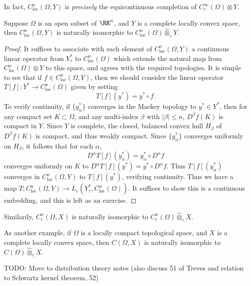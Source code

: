In fact, $C^n_{\text{loc}}(\Omega,Y)$ is \emph{precisely} the equicontinuous completion of $C_c^\infty(\Omega) \otimes Y$.

\begin{theorem}
    Suppose $\Omega$ is an open subset of $\RR^n$, and $Y$ is a complete locally convex space, then $C^n_{\text{loc}}(\Omega,Y)$ is naturally isomorphic to $C^n_{\text{loc}}(\Omega) \widehat{\otimes}_\varepsilon Y$.
\end{theorem}
\begin{proof}
    It suffices to associate with each element of $C^n_{\text{loc}}(\Omega,Y)$ a continuous linear operator from $Y^*_\tau$ to $C^n_{\text{loc}}(\Omega)$ which extends the natural map from $C^n_{\text{loc}}(\Omega) \otimes Y$ to this space, and agrees with the required topologies. It is simple to see that if $f \in C^n_{\text{loc}}(\Omega,Y)$, then we should consider the linear operator $T[f]: Y^* \to C^n_{\text{loc}}(\Omega)$ given by setting
    \[ T[f](y^*) = y^* \circ f. \]
    To verify continuity, if $\{ y^*_\alpha \}$ converges in the Mackey topology to $y^* \in Y^*$, then for any compact set $K \subset \Omega$, and any multi-index $\beta$ with $|\beta| \leq n$, $D^\beta f(K)$ is compact in $Y$. Since $Y$ is complete, the closed, balanced convex hull $H_\beta$ of $D^\beta f(K)$ is compact, and thus weakly compact. Since $\{ y_\alpha^* \}$ converges uniformly on $H_\beta$, it follows that for each $\alpha$,
    \[ D^\alpha T[f](y^*_\alpha) = y^*_\alpha \circ D^\alpha f \]
    converges uniformly on $K$ to $D^\alpha T[f](y^*) = y^* \circ D^\alpha f$. Thus $T[f](y^*_\alpha)$ converges in $C^n_{\text{loc}}(\Omega,Y)$ to $T[f](y^*)$, verifying continuity. Thus we have a map $T; C^n_{\text{loc}}(\Omega,Y) \to L_\varepsilon(Y^*_\tau, C^n_{\text{loc}}(\Omega))$. It suffices to show this is a continuous embedding, and this is left as an exercise.
\end{proof}

Similarily, $C_c^n(\Omega,X)$ is naturally isomorphic to $C_c^n(\Omega) \widehat{\otimes}_\varepsilon X$.

As another example, if $\Omega$ is a locally compact topological space, and $X$ is a complete locally convex space, then $C(\Omega,X)$ is naturally isomorphic to $C(\Omega) \widehat{\otimes}_\varepsilon X$.


TODO: Move to distribution theory notes (also discuss 51 of Treves and relation to Schwartz kernel theorem, 52)



